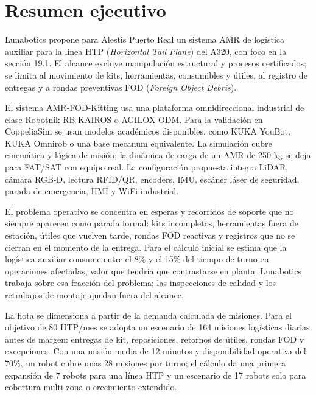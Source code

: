 \chapter*{Resumen ejecutivo}

\begin{summarybox}
Lunabotics propone para Alestis Puerto Real un sistema AMR de logística auxiliar para la línea HTP (\textit{Horizontal Tail Plane}) del A320, con foco en la sección 19.1. El alcance excluye manipulación estructural y procesos certificados; se limita al movimiento de kits, herramientas, consumibles y útiles, al registro de entregas y a rondas preventivas FOD (\textit{Foreign Object Debris}).
\end{summarybox}

El sistema AMR-FOD-Kitting usa una plataforma omnidireccional industrial de clase Robotnik RB-KAIROS o AGILOX ODM. Para la validación en CoppeliaSim se usan modelos académicos disponibles, como KUKA YouBot, KUKA Omnirob o una base mecanum equivalente. La simulación cubre cinemática y lógica de misión; la dinámica de carga de un AMR de 250 kg se deja para FAT/SAT con equipo real. La configuración propuesta integra LiDAR, cámara RGB-D, lectura RFID/QR, encoders, IMU, escáner láser de seguridad, parada de emergencia, HMI y WiFi industrial.

El problema operativo se concentra en esperas y recorridos de soporte que no siempre aparecen como parada formal: kits incompletos, herramientas fuera de estación, útiles que vuelven tarde, rondas FOD reactivas y registros que no se cierran en el momento de la entrega. Para el cálculo inicial se estima que la logística auxiliar consume entre el 8\% y el 15\% del tiempo de turno en operaciones afectadas, valor que tendría que contrastarse en planta. Lunabotics trabaja sobre esa fracción del problema; las inspecciones de calidad y los retrabajos de montaje quedan fuera del alcance.

La flota se dimensiona a partir de la demanda calculada de misiones. Para el objetivo de 80 HTP/mes se adopta un escenario de 164 misiones logísticas diarias antes de margen: entregas de kit, reposiciones, retornos de útiles, rondas FOD y excepciones. Con una misión media de 12 minutos y disponibilidad operativa del 70\%, un robot cubre unas 28 misiones por turno; el cálculo da una primera expansión de 7 robots para una línea HTP y un escenario de 17 robots solo para cobertura multi-zona o crecimiento extendido.

